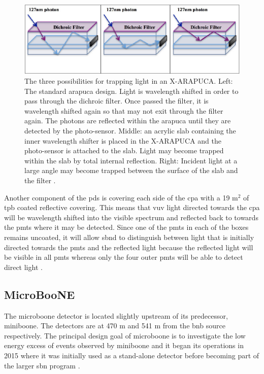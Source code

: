 \begin{figure}[!h]
    \centering
    \includegraphics[width = \hugefigwidth]{figures-chap3/arapuca.png}
    \caption[ARAPUCA operating principle.]{The three possibilities for trapping light in an X-ARAPUCA. Left: The standard \gls{arapuca} design. Light is wavelength shifted in order to pass through the dichroic filter. Once passed the filter, it is wavelength shifted again so that may not exit through the filter again. The photons are reflected within the \gls{arapuca} until they are detected by the photo-sensor. Middle: an acrylic slab containing the inner wavelength shifter is placed in the X-ARAPUCA and the photo-sensor is attached to the slab. Light may become trapped within the slab by total internal reflection. Right: Incident light at a large angle may become trapped between the surface of the slab and the filter \cite{X-ARAPUCA}.}
    \label{fig:arapuca}
\end{figure}

Another component of the \gls{pds} is covering each side of the \gls{cpa} with a 19 m$^2$ of \gls{tpb} coated reflective covering. This means that \gls{vuv} light directed towards the \gls{cpa} will be wavelength shifted into the visible spectrum and reflected back to towards the \glspl{pmt} where it may be detected. Since one of the \glspl{pmt} in each of the boxes remains uncoated, it will allow \gls{sbnd} to distinguish between light that is initially directed towards the \glspl{pmt} and the reflected light because the reflected light will be visible in all \glspl{pmt} whereas only the four outer \glspl{pmt} will be able to detect direct light \cite{LArTPC_review}. 

\newpage
\subsection{MicroBooNE}\label{sec:MicroBooNE}
The \gls{microboone} detector is located slightly upstream of its predecessor, \gls{miniboone}. The detectors are at 470 m and 541 m from the \gls{bnb} source respectively. The principal design goal of \gls{microboone} is to investigate the low energy excess of events observed by \gls{miniboone} and it began its operations in 2015 where it was initially used as a stand-alone detector before becoming part of the larger \gls{sbn} program \cite{microboone_detector}.

